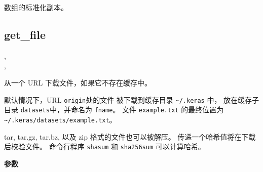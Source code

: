 数组的标准化副本。



\subsection{get\_file}\label{get-file}

\begin{Shaded}
\begin{Highlighting}[]
\OperatorTok{=}\OperatorTok{=}\OperatorTok{=}, \\
\hspace{3cm}\OperatorTok{=}\OperatorTok{=}\OperatorTok{=}, \\
\hspace{3cm}\OperatorTok{=}\OperatorTok{=}\NormalTok{)}
\end{Highlighting}
\end{Shaded}

从一个 URL 下载文件，如果它不存在缓存中。

默认情况下，URL \texttt{origin}处的文件 被下载到缓存目录
\texttt{\textasciitilde{}/.keras} 中， 放在缓存子目录 \texttt{datasets}中，并命名为
\texttt{fname}。 文件 \texttt{example.txt} 的最终位置为
\texttt{\textasciitilde{}/.keras/datasets/example.txt}。

tar, tar.gz, tar.bz, 以及 zip 格式的文件也可以被解压。
传递一个哈希值将在下载后校验文件。 命令行程序 \texttt{shasum} 和
\texttt{sha256sum} 可以计算哈希。

\textbf{参数}

